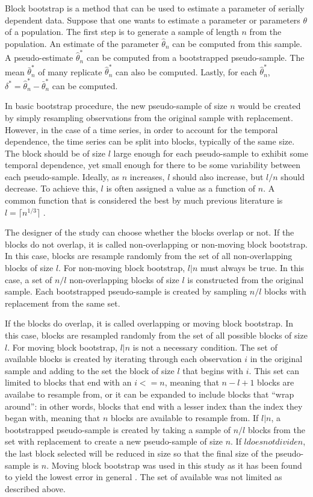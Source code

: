 \documentclass[12pt, letterpaper, titlepage]{article}
\begin{document}
Block bootstrap is a method that can be used to estimate a parameter of
serially dependent data. Suppose that one wants to estimate a parameter or
parameters $\theta$ of a population. The first step is to generate a sample of
length $n$ from the population. An estimate of the parameter
$\hat{\theta}_{n}$ can be computed from this sample. A pseudo-estimate
$\hat\theta_n^*$ can be computed from a bootstrapped pseudo-sample. The mean
$\bar\theta_n^*$ of many replicate $\hat\theta_n^*$ can also be computed.
Lastly, for each $\hat\theta_n^*$, $\delta^* = \hat\theta_n^* -
\bar\theta_n^*$ can be computed.


In basic bootstrap procedure, the new pseudo-sample of size $n$ would be
created by simply resampling observations from the original sample with
replacement. However, in the case of a time series, in order to account for
the temporal dependence, the time series can be split into blocks, typically
of the same size. The block should be of size $l$ large enough for each
pseudo-sample to exhibit some temporal dependence, yet small enough for there
to be some variability between each pseudo-sample. Ideally, as $n$ increases,
$l$ should also increase, but $l / n$ should decrease. To achieve this, $l$ is
often assigned a value as a function of $n$. A common function that is
considered the best by much previous literature is $l = \lceil n^{1/3} \rceil$
\citep{buhlmann1999block}.


The designer of the study can choose whether the blocks overlap or not. If the
blocks do not overlap, it is called non-overlapping or non-moving block
bootstrap. In this case, blocks are resample randomly from the set of all
non-overlapping blocks of size $l$. For non-moving block bootstrap, $l \vert n$
must always be true. In this case, a set of $n / l$ non-overlapping blocks of
size $l$ is constructed from the original sample. Each bootstrapped
pseudo-sample is created by sampling $n / l$ blocks with replacement from the
same set.

If the blocks do overlap, it is called overlapping or moving block bootstrap.
In this case, blocks are resampled randomly from the set of all possible
blocks of size $l$. For moving block bootstrap, $l \vert n$ is not a necessary
condition. The set of available blocks is created by iterating through each
observation $i$ in the original sample and adding to the set the block of size
$l$ that begins with $i$. This set can limited to blocks that end with an
$i <= n$, meaning that $n - l + 1$ blocks are availabe to resample from, or it
can be expanded to include blocks that ``wrap around'': in
other words, blocks that end with a lesser index than the index they began
with, meaning that $n$ blocks are available to resample from. If $l \vert n$,
a bootstrapped pseudo-sample is created by taking a sample of $n / l$ blocks
from the set with replacement to create a new pseudo-sample of size $n$. If
$l does not divide n$, the last block selected will be reduced in size so that
the final size of the pseudo-sample is $n$. Moving block bootstrap was used in
this study as it has been found to yield the lowest error in general
\citep{radovanov2014comparison}. The set of available was not limited as
described above.
\end{document}
